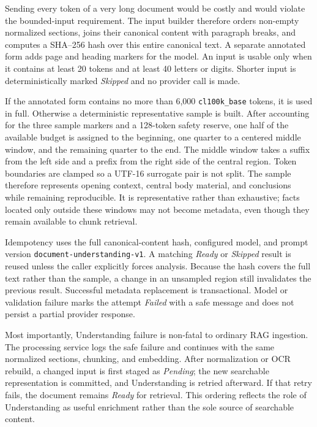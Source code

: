 Sending every token of a very long document would be costly and would violate
the bounded-input requirement. The input builder therefore orders non-empty
normalized sections, joins their canonical content with paragraph breaks, and
computes a SHA--256 hash over this entire canonical text. A separate annotated
form adds page and heading markers for the model. An input is usable only when
it contains at least 20 tokens and at least 40 letters or digits. Shorter input
is deterministically marked \emph{Skipped} and no provider call is made.

If the annotated form contains no more than 6,000 \texttt{cl100k\_base} tokens,
it is used in full. Otherwise a deterministic representative sample is built.
After accounting for the three sample markers and a 128-token safety reserve,
one half of the available budget is assigned to the beginning, one quarter to
a centered middle window, and the remaining quarter to the end. The middle
window takes a suffix from the left side and a prefix from the right side of the
central region. Token boundaries are clamped so a UTF-16 surrogate pair is not
split. The sample therefore represents opening context, central body material,
and conclusions while remaining reproducible. It is representative rather
than exhaustive; facts located only outside these windows may not become
metadata, even though they remain available to chunk retrieval.

Idempotency uses the full canonical-content hash, configured model, and prompt
version \texttt{document-understanding-v1}. A matching \emph{Ready} or
\emph{Skipped} result is reused unless the caller explicitly forces analysis.
Because the hash covers the full text rather than the sample, a change in an
unsampled region still invalidates the previous result. Successful metadata
replacement is transactional. Model or validation failure marks the attempt
\emph{Failed} with a safe message and does not persist a partial provider
response.

Most importantly, Understanding failure is non-fatal to ordinary RAG
ingestion. The processing service logs the safe failure and continues with the
same normalized sections, chunking, and embedding. After normalization or OCR
rebuild, a changed input is first staged as \emph{Pending}; the new searchable
representation is committed, and Understanding is retried afterward. If that
retry fails, the document remains \emph{Ready} for retrieval. This ordering
reflects the role of Understanding as useful enrichment rather than the sole
source of searchable content.

